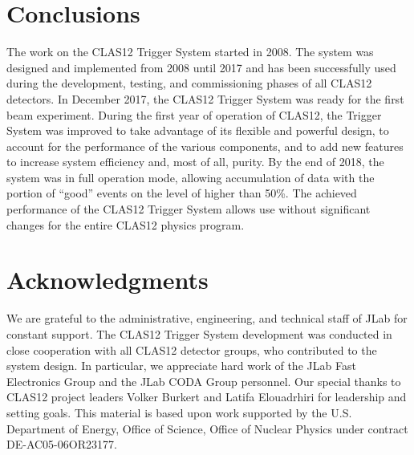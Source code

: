 \section{Conclusions}

The work on the CLAS12 Trigger System started in 2008. The system was designed and implemented from
2008 until 2017 and has been successfully used during the development, testing, and commissioning phases of
all CLAS12 detectors. In December 2017, the CLAS12 Trigger System was ready for the first beam experiment.
During the first year of operation of CLAS12, the Trigger System was improved to take advantage of its flexible
and powerful design, to account for the performance of the various components, and to add new features to
increase system efficiency and, most of all, purity. By the end of 2018, the system was in full operation mode,
allowing accumulation of data with the portion of ``good'' events on the level of higher than 50\%. The achieved
performance of the CLAS12 Trigger System allows use without significant changes for the entire CLAS12
physics program.

\section{Acknowledgments}

We are grateful to the administrative, engineering, and technical staff of JLab for constant support. The
CLAS12 Trigger System development was conducted in close cooperation with all CLAS12 detector groups, who
contributed to the system design. In particular, we appreciate hard work of the JLab Fast Electronics Group
and the JLab CODA Group personnel. Our special thanks to CLAS12 project leaders Volker Burkert and Latifa
Elouadrhiri for leadership and setting goals. This material is based upon work supported by the U.S.
Department of Energy, Office of Science, Office of Nuclear Physics under contract DE-AC05-06OR23177.


